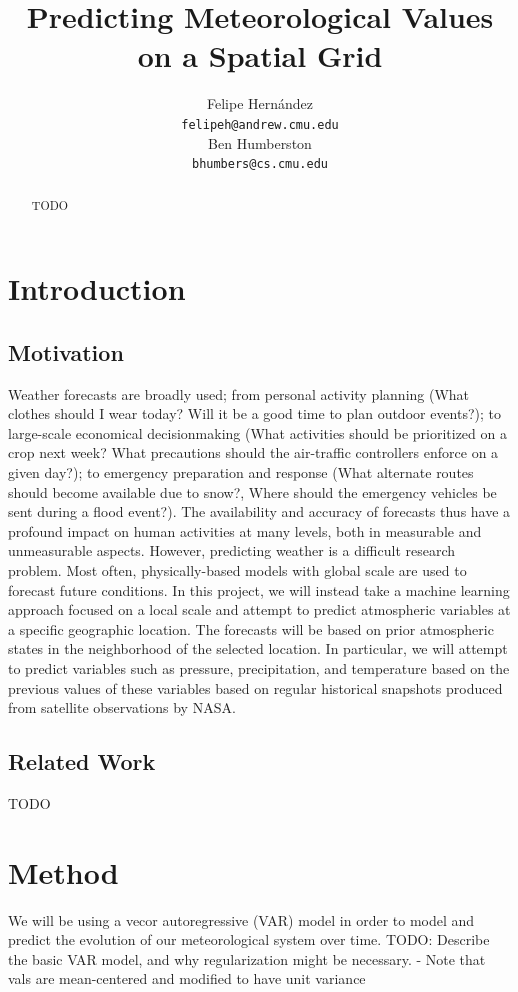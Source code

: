\documentclass{article} %
\title{Predicting Meteorological Values on a Spatial Grid}
\author{
Felipe Hern\'{a}ndez \\
\texttt{felipeh@andrew.cmu.edu} \\
\And
Ben Humberston\\
\texttt{bhumbers@cs.cmu.edu} \\
}
\begin{document}
\maketitle

\begin{abstract}
TODO
\end{abstract}

\section{Introduction}
\label{sec:intro}

\subsection{Motivation}
\label{sec:motivation}
Weather forecasts are broadly used; from personal activity planning (What clothes should I wear 
today? Will it be a good time to plan outdoor events?); to large-scale economical decisionmaking (What activities should be prioritized on a crop next week? What precautions should the 
air-traffic controllers enforce on a given day?); to emergency preparation and response (What 
alternate routes should become available due to snow?, Where should the emergency vehicles 
be sent during a flood event?). The availability and accuracy of forecasts thus have a profound 
impact on human activities at many levels, both in measurable and unmeasurable aspects.
However, predicting weather is a difficult research problem. Most often, physically-based 
models with global scale are used to forecast future conditions. In this project, we will instead 
take a machine learning approach focused on a local scale and attempt to predict atmospheric 
variables at a specific geographic location. The forecasts will be based on prior atmospheric 
states in the neighborhood of the selected location. In particular, we will attempt to predict 
variables such as pressure, precipitation, and temperature based on the previous values of 
these variables based on regular historical snapshots produced from satellite observations by 
NASA.

\subsection{Related Work}\label{sec:related_work}
TODO

\section{Method}
\label{sec:method}
We will be using a vecor autoregressive (VAR) model in order to model and predict the evolution of our meteorological system over time. 
TODO: Describe the basic VAR model, and why regularization might be necessary.
- Note that vals are mean-centered and modified to have unit variance
\end{document}
